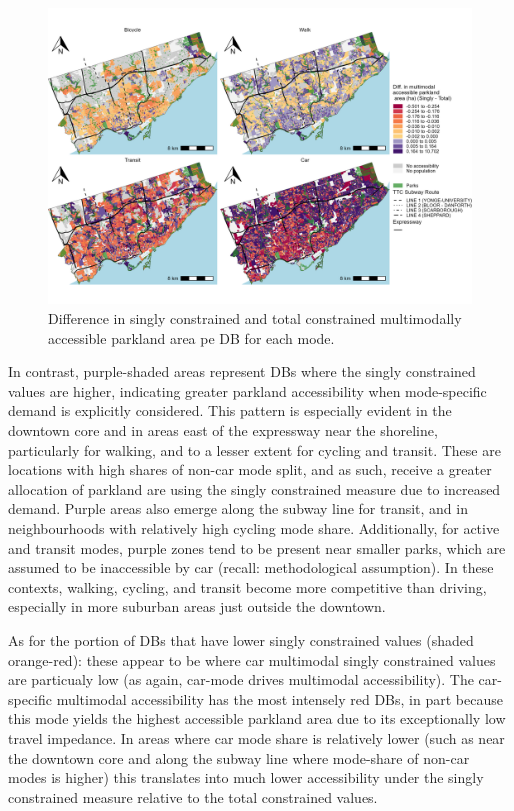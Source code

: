 \documentclass[
11pt, %
oneside, %
english, %
singlespacing, %
]{macthesis} %
\begin{document}
\begin{figure}

{\centering \includegraphics[width=6in]{./data/figures/chp5-mm_parkland_diff_conc_access_DB_plots} 

}

\caption{\label{fig:chp5-mm_parkland_diff_conc_access_DB_plots}Difference in singly constrained and total constrained multimodally accessible parkland area pe DB for each mode.}\label{fig:unnamed-chunk-78}
\end{figure}

In contrast, purple-shaded areas represent DBs where the singly constrained values are higher, indicating greater parkland accessibility when mode-specific demand is explicitly considered. This pattern is especially evident in the downtown core and in areas east of the expressway near the shoreline, particularly for walking, and to a lesser extent for cycling and transit. These are locations with high shares of non-car mode split, and as such, receive a greater allocation of parkland are using the singly constrained measure due to increased demand. Purple areas also emerge along the subway line for transit, and in neighbourhoods with relatively high cycling mode share. Additionally, for active and transit modes, purple zones tend to be present near smaller parks, which are assumed to be inaccessible by car (recall: methodological assumption). In these contexts, walking, cycling, and transit become more competitive than driving, especially in more suburban areas just outside the downtown.

As for the portion of DBs that have lower singly constrained values (shaded orange-red): these appear to be where car multimodal singly constrained values are particualy low (as again, car-mode drives multimodal accessibility). The car-specific multimodal accessibility has the most intensely red DBs, in part because this mode yields the highest accessible parkland area due to its exceptionally low travel impedance. In areas where car mode share is relatively lower (such as near the downtown core and along the subway line where mode-share of non-car modes is higher) this translates into much lower accessibility under the singly constrained measure relative to the total constrained values.
\end{document}
